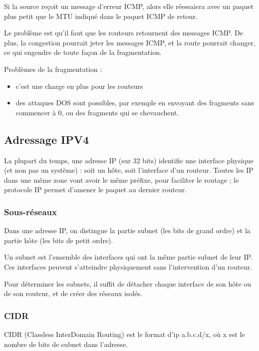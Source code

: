 	Si la source reçoit un message d'erreur ICMP, alors elle réessaiera avec un paquet plus petit que le MTU indiqué dans le paquet ICMP de retour.
	
	Le problème est qu'il faut que les routeurs retournent des messages ICMP. De plus, la congestion pourrait jeter les messages ICMP, et la route pourrait changer, ce qui engendre de toute façon de la fragmentation.
	
	Problèmes de la fragmentation :
	
	\begin{itemize}
		\item c'est une charge en plus pour les routeurs
		\item des attaques DOS sont possibles, par exemple en envoyant des fragments sans commencer à 0, ou des fragments qui se chevauchent.
	\end{itemize}
	
	\subsection{Adressage IPV4}
	
	La plupart du temps, une adresse IP (sur 32 bits) identifie une interface physique (et non pas un système) : soit un hôte, soit l'interface d'un routeur. Toutes les IP dans une même zone vont avoir le même préfixe, pour faciliter le routage ; le protocole IP permet d'amener le paquet au dernier routeur.
		\subsubsection{Sous-réseaux}
		
		Dans une adresse IP, on distingue la partie subnet (les bits de grand ordre) et la partie hôte (les bits de petit ordre).
		
		Un subnet est l'ensemble des interfaces qui ont la même partie subnet de leur IP. Ces interfaces peuvent s'atteindre physiquement sans l'intervention d'un routeur.
		
		Pour déterminer les subnets, il suffit de détacher chaque interface de son hôte ou de son routeur, et de créer des réseaux isolés.
		
		\subsubsection{CIDR}
		
		CIDR (Classless InterDomain Routing) est le format d'ip a.b.c.d/x, où x est le nombre de bits de subnet dans l'adresse.
		
